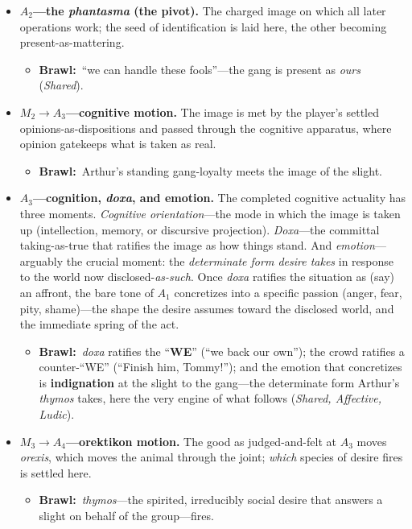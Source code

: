 \documentclass[11pt]{article}
\newcommand{\inb}{\textbf{Brawl:}~}
\newcommand{\too}{\ensuremath{\to}}
\begin{document}
\begin{itemize}
  \item \textbf{$A_2$---the \emph{phantasma} (the pivot).} The charged image on which all later operations work; the seed of identification is laid here, the other becoming present-as-mattering.
    \begin{itemize}\item \inb ``we can handle these fools''---the gang is present as \emph{ours} (\emph{Shared}).\end{itemize}
  \item \textbf{$M_2\too A_3$---cognitive motion.} The image is met by the player's settled opinions-as-dispositions and passed through the cognitive apparatus, where opinion gatekeeps what is taken as real.
    \begin{itemize}\item \inb Arthur's standing gang-loyalty meets the image of the slight.\end{itemize}
  \item \textbf{$A_3$---cognition, \emph{doxa}, and emotion.} The completed cognitive actuality has three moments. \emph{Cognitive orientation}---the mode in which the image is taken up (intellection, memory, or discursive projection). \emph{Doxa}---the committal taking-as-true that ratifies the image as how things stand. And \emph{emotion}---arguably the crucial moment: the \emph{determinate form desire takes} in response to the world now disclosed-\emph{as-such}. Once \textit{doxa} ratifies the situation as (say) an affront, the bare tone of $A_1$ concretizes into a specific passion (anger, fear, pity, shame)---the shape the desire assumes toward the disclosed world, and the immediate spring of the act.
    \begin{itemize}\item \inb \textit{doxa} ratifies the ``\textbf{WE}'' (``we back our own''); the crowd ratifies a counter-``WE'' (``Finish him, Tommy!''); and the emotion that concretizes is \textbf{indignation} at the slight to the gang---the determinate form Arthur's \textit{thymos} takes, here the very engine of what follows (\emph{Shared, Affective, Ludic}).\end{itemize}
  \item \textbf{$M_3\too A_4$---orektikon motion.} The good as judged-and-felt at $A_3$ moves \textit{orexis}, which moves the animal through the joint; \emph{which} species of desire fires is settled here.
    \begin{itemize}\item \inb \textit{thymos}---the spirited, irreducibly social desire that answers a slight on behalf of the group---fires.\end{itemize}

\end{itemize}
\end{document}
